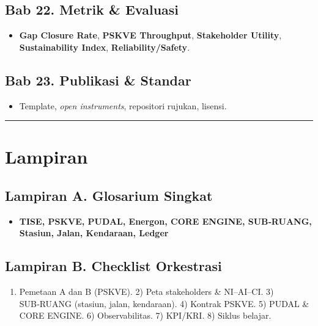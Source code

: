 \documentclass[
  letterpaper,
  DIV=11,
  numbers=noendperiod]{scrartcl}
\providecommand{\tightlist}{%
  \setlength{\itemsep}{0pt}\setlength{\parskip}{0pt}}
\begin{document}
\subsection{Bab 22. Metrik \& Evaluasi}\label{bab-22.-metrik-evaluasi}

\begin{itemize}
\tightlist
\item
  \textbf{Gap Closure Rate}, \textbf{PSKVE Throughput},
  \textbf{Stakeholder Utility}, \textbf{Sustainability Index},
  \textbf{Reliability/Safety}.
\end{itemize}

\subsection{Bab 23. Publikasi \&
Standar}\label{bab-23.-publikasi-standar}

\begin{itemize}
\tightlist
\item
  Template, \emph{open instruments}, repositori rujukan, lisensi.
\end{itemize}

\begin{center}\rule{0.5\linewidth}{0.5pt}\end{center}

\section{Lampiran}\label{lampiran}

\subsection{Lampiran A. Glosarium
Singkat}\label{lampiran-a.-glosarium-singkat}

\begin{itemize}
\tightlist
\item
  \textbf{TISE, PSKVE, PUDAL, Energon, CORE ENGINE, SUB‑RUANG, Stasiun,
  Jalan, Kendaraan, Ledger}
\end{itemize}

\subsection{Lampiran B. Checklist
Orkestrasi}\label{lampiran-b.-checklist-orkestrasi}

\begin{enumerate}
\def\labelenumi{\arabic{enumi}.}
\tightlist
\item
  Pemetaan A dan B (PSKVE). 2) Peta stakeholders \& NI--AI--CI. 3)
  SUB‑RUANG (stasiun, jalan, kendaraan). 4) Kontrak PSKVE. 5) PUDAL \&
  CORE ENGINE. 6) Observabilitas. 7) KPI/KRI. 8) Siklus belajar.
\end{enumerate}
\end{document}
